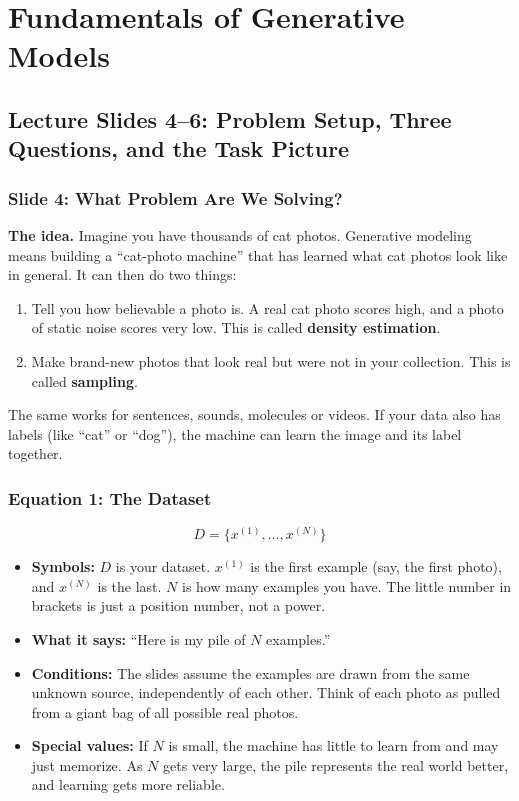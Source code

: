 \section{Fundamentals of Generative Models}

\subsection*{Lecture Slides 4--6: Problem Setup, Three Questions, and the Task Picture}

\subsubsection*{Slide 4: What Problem Are We Solving?}

\textbf{The idea.} Imagine you have thousands of cat photos. Generative modeling means building a ``cat-photo machine'' that has learned what cat photos look like in general. It can then do two things:

\begin{enumerate}
  \item Tell you how believable a photo is. A real cat photo scores high, and a photo of static noise scores very low. This is called \textbf{density estimation}.
  \item Make brand-new photos that look real but were not in your collection. This is called \textbf{sampling}.
\end{enumerate}

The same works for sentences, sounds, molecules or videos. If your data also has labels (like ``cat'' or ``dog''), the machine can learn the image and its label together.

\subsubsection*{Equation 1: The Dataset}

\[
D = \{x^{(1)}, \ldots, x^{(N)}\}
\]

\begin{itemize}
  \item \textbf{Symbols:} $D$ is your dataset. $x^{(1)}$ is the first example (say, the first photo), and $x^{(N)}$ is the last. $N$ is how many examples you have. The little number in brackets is just a position number, not a power.
  \item \textbf{What it says:} ``Here is my pile of $N$ examples.''
  \item \textbf{Conditions:} The slides assume the examples are drawn from the same unknown source, independently of each other. Think of each photo as pulled from a giant bag of all possible real photos.
  \item \textbf{Special values:} If $N$ is small, the machine has little to learn from and may just memorize. As $N$ gets very large, the pile represents the real world better, and learning gets more reliable.
\end{itemize}

